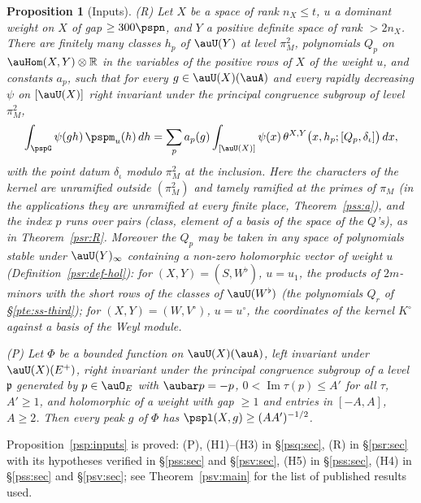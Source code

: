 \documentclass[10pt]{amsart}
\newtheorem{proposition}[theorem]{Proposition}
\theoremstyle{definition}
\theoremstyle{remark}
\newcommand{\R}{\mathbb R}
\newcommand{\Iml}{\operatorname{Im}}
\begin{document}
\begin{proposition}[Inputs]
\textup{(R)} Let $X$ be a space of rank $n_X\le t$, $u$ a dominant weight on $X$ of gap $\ge300\pspn$,
and $Y$ a positive definite space of rank $>2n_X$. There are finitely many classes $h_p$ of $\auU(Y)$
at level $\pi_M^2$, polynomials $Q_p$ on $\auHom(X,Y)\otimes\R$ in the variables of the positive
rows of $X$ of the weight $u$, and constants $a_p$, such that for every $g\in\auU(X)(\auA)$ and every
rapidly decreasing $\psi$ on $[\auU(X)]$ right invariant under the principal congruence subgroup of
level $\pi_M^2$,
\[
\int_{\pspG}\psi(gh)\,\pspm_u(h)\,dh=\sum_pa_p(g)\int_{[\auU(X)]}\psi(x)\,\theta^{X,Y}\bigl(x,h_p;
[Q_p,\delta_\iota]\bigr)\,dx ,
\]
with the point datum $\delta_\iota$ modulo $\pi_M^2$ at the inclusion. Here the characters of the kernel are
unramified outside $(\pi_M^2)$ and tamely ramified at the primes of $\pi_M$ (in the applications they are unramified at every finite place, Theorem~\ref{pss:a}), and the index $p$ runs over pairs (class, element of a basis of the space
of the $Q$'s), as in Theorem~\ref{psr:R}. Moreover the $Q_p$ may be taken
in any space of polynomials stable under $\auU(Y)_\infty$ containing a non-zero holomorphic vector of
weight $u$ (Definition~\ref{psr:def-hol}): for $(X,Y)=(S,W^\flat)$, $u=u_1$, the products of $2m$-minors with the short rows of the
classes of $\auU(W^\flat)$ (the polynomials $Q_r$ of \S\ref{pte:ss-third}); for $(X,Y)=(W,V^\circ)$,
$u=u^\circ$, the coordinates of the kernel $K^\circ$ against a basis of the Weyl module.

\textup{(P)} Let $\Phi$ be a bounded function on $\auU(X)(\auA)$, left invariant under $\auU(X)(E^+)$,
right invariant under the principal congruence subgroup of a level $\mathfrak p$ generated by
$p\in\auO_E$ with $\aubar p=-p$, $0<\Iml\tau(p)\le A'$ for all $\tau$, $A'\ge1$, and holomorphic of a
weight with gap $\ge1$ and entries in $[-A,A]$, $A\ge2$. Then every peak $g$ of $\Phi$ has
$\pspl(X,g)\ge(AA')^{-1/2}$.
\end{proposition}
\noindent Proposition~\ref{psp:inputs} is proved: (P), (H1)--(H3) in \S\ref{psq:sec}, (R) in \S\ref{psr:sec} with its
hypotheses verified in \S\ref{pss:sec} and \S\ref{psv:sec}, (H5) in \S\ref{pss:sec}, (H4) in \S\ref{pss:sec} and
\S\ref{psv:sec}; see Theorem~\ref{psv:main} for the list of published results used.
\end{document}
